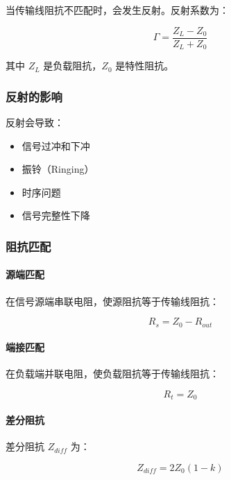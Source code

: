 当传输线阻抗不匹配时，会发生反射。反射系数为：

\begin{equation}
\Gamma = \frac{Z_L - Z_0}{Z_L + Z_0} \label{eq:reflection-coefficient}
\end{equation}

其中 $Z_L$ 是负载阻抗，$Z_0$ 是特性阻抗。

\subsubsection{反射的影响}

反射会导致：
\begin{itemize}
  \item 信号过冲和下冲
  \item 振铃（Ringing）
  \item 时序问题
  \item 信号完整性下降
\end{itemize}

\subsubsection{阻抗匹配}

\paragraph{源端匹配}

在信号源端串联电阻，使源阻抗等于传输线阻抗：

\begin{equation}
R_s = Z_0 - R_{out} \label{eq:source-termination}
\end{equation}

\paragraph{端接匹配}

在负载端并联电阻，使负载阻抗等于传输线阻抗：

\begin{equation}
R_t = Z_0 \label{eq:termination-resistor}
\end{equation}

\paragraph{差分阻抗}

差分阻抗 $Z_{diff}$ 为：

\begin{equation}
Z_{diff} = 2 Z_0 (1 - k) \label{eq:differential-impedance}
\end{equation}

